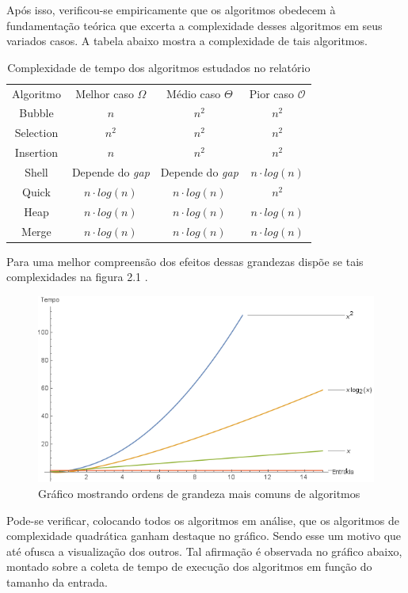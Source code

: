 \documentclass[a4paper, 12pt]{report}
\begin{document}
Após isso, verificou-se empiricamente que os algoritmos obedecem à
fundamentação teórica que excerta a complexidade desses algoritmos em seus
variados casos. A tabela abaixo mostra a complexidade de tais algoritmos.

\begin{table}[htb]
\caption{Complexidade de tempo dos algoritmos estudados no relatório}
\centering
\begin{tabular}{cccc}
Algoritmo & Melhor caso $\Omega$ & Médio caso $\Theta$ & Pior caso $\mathcal{O}$\\
Bubble & $n$ & $n^2$ & $n^2$\\
Selection & $n^2$ & $n^2$ & $n^2$\\
Insertion & $n$ & $n^2$ & $n^2$\\
Shell & Depende do \emph{gap} & Depende do \emph{gap} & $n \cdot log{}(n)$\\
Quick & $n \cdot log{}(n)$ & $n \cdot log{}(n)$ & $n^2$\\
Heap & $n \cdot log{}(n)$ & $n \cdot log{}(n)$ & $n \cdot log{}(n)$\\
Merge & $n \cdot log{}(n)$ & $n \cdot log{}(n)$ & $n \cdot log{}(n)$\\
\end{tabular}
\end{table}

Para uma melhor compreensão dos efeitos dessas grandezas dispõe se tais
complexidades na figura 2.1 .

\begin{figure}[htb]
\centering
\includegraphics[width=.9\linewidth]{./img/ordens_grandeza.png}
\caption{\small Gráfico mostrando ordens de grandeza mais comuns de algoritmos}
\end{figure}

Pode-se verificar, colocando todos os algoritmos em análise, que os algoritmos
de complexidade quadrática ganham destaque no gráfico. Sendo esse um motivo que
até ofusca a visualização dos outros. Tal afirmação é observada no gráfico
abaixo, montado sobre a coleta de tempo de execução dos algoritmos em função
do tamanho da entrada.
\end{document}
